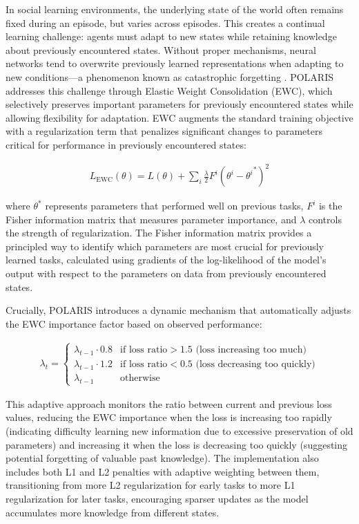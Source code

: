 In social learning environments, the underlying state of the world often remains fixed during an episode, but varies across episodes. This creates a continual learning challenge: agents must adapt to new states while retaining knowledge about previously encountered states. Without proper mechanisms, neural networks tend to overwrite previously learned representations when adapting to new conditions—a phenomenon known as catastrophic forgetting \citep{vandeven2024continuallearningcatastrophicforgetting}. POLARIS addresses this challenge through Elastic Weight Consolidation (EWC), which selectively preserves important parameters for previously encountered states while allowing flexibility for adaptation. EWC augments the standard training objective with a regularization term that penalizes significant changes to parameters critical for performance in previously encountered states:

\begin{align}
    L_{\text{EWC}}(\theta) = L(\theta) + \sum_i \frac{\lambda}{2} F^i (\theta^i - {\theta^i}^*)^2
\end{align}

where $\theta^*$ represents parameters that performed well on previous tasks, $F^i$ is the Fisher information matrix that measures parameter importance, and $\lambda$ controls the strength of regularization. The Fisher information matrix provides a principled way to identify which parameters are most crucial for previously learned tasks, calculated using gradients of the log-likelihood of the model's output with respect to the parameters on data from previously encountered states.

Crucially, POLARIS introduces a dynamic mechanism that automatically adjusts the EWC importance factor based on observed performance:

\begin{align}
    \lambda_t = 
    \begin{cases}
        \lambda_{t-1} \cdot 0.8 & \text{if loss ratio} > 1.5 \text{ (loss increasing too much)} \\
        \lambda_{t-1} \cdot 1.2 & \text{if loss ratio} < 0.5 \text{ (loss decreasing too quickly)} \\
        \lambda_{t-1} & \text{otherwise}
    \end{cases}
\end{align}

This adaptive approach monitors the ratio between current and previous loss values, reducing the EWC importance when the loss is increasing too rapidly (indicating difficulty learning new information due to excessive preservation of old parameters) and increasing it when the loss is decreasing too quickly (suggesting potential forgetting of valuable past knowledge). The implementation also includes both L1 and L2 penalties with adaptive weighting between them, transitioning from more L2 regularization for early tasks to more L1 regularization for later tasks, encouraging sparser updates as the model accumulates more knowledge from different states.

